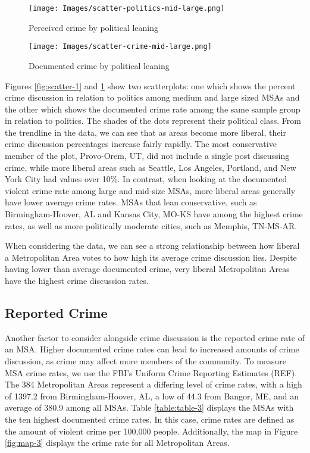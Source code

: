\documentclass[12pt,oneside, letterpaper]{book}
\begin{document}
\begin{figure}[!tbp]
  \centering
  \begin{minipage}[b]{0.45\textwidth}
    \texttt{[image: Images/scatter-politics-mid-large.png]}
    \caption{Perceived crime by political leaning}
    \label{fig:scatter-1}
  \end{minipage}
  \hfill
  \begin{minipage}[b]{0.45\textwidth}
    \texttt{[image: Images/scatter-crime-mid-large.png]}
    \caption{Documented crime by political leaning}
    \label{fig:scatter-2}
  \end{minipage}
\end{figure}

\par Figures \ref{fig:scatter-1} and \ref{fig:scatter-2} show two scatterplots: one which shows the percent crime discussion in relation to politics among medium and large sized MSAs and the other which shows the documented crime rate among the same sample group in relation to politics. The shades of the dots represent their political class. From the trendline in the data, we can see that as areas become more liberal, their crime discussion percentages increase fairly rapidly. The most conservative member of the plot, Provo-Orem, UT, did not include a single post discussing crime, while more liberal areas such as Seattle, Los Angeles, Portland, and New York City had values over 10\%. In contrast, when looking at the documented violent crime rate among large and mid-size MSAs, more liberal areas generally have lower average crime rates. MSAs that lean conservative, such as Birmingham-Hoover, AL and Kansas City, MO-KS have among the highest crime rates, as well as more politically moderate cities, such as Memphis, TN-MS-AR.

\par When considering the data, we can see a strong relationship between how liberal a Metropolitan Area votes to how high its average crime discussion lies. Despite having lower than average documented crime, very liberal Metropolitan Areas have the highest crime discussion rates.

\subsection{Reported Crime}

\par Another factor to consider alongside crime discussion is the reported crime rate of an MSA. Higher documented crime rates can lead to increased amounts of crime discussion, as crime may affect more members of the community. To measure MSA crime rates, we use the FBI's Uniform Crime Reporting Estimates (REF). The 384 Metropolitan Areas represent a differing level of crime rates, with a high of 1397.2 from Birmingham-Hoover, AL, a low of 44.3 from Bangor, ME, and an average of 380.9 among all MSAs. Table \ref{table:table-3} displays the MSAs with the ten highest documented crime rates. In this case, crime rates are defined as the amount of violent crime per 100,000 people. Additionally, the map in Figure \ref{fig:map-3} displays the crime rate for all Metropolitan Areas.
\end{document}
